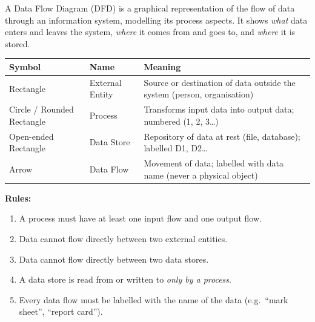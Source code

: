 \documentclass[11pt]{article}
\newcommand{\cle}[1]{{\popxbold\color{popdark}#1}}
\begin{document}
\begin{definition}
A \cle{Data Flow Diagram (DFD)} is a graphical representation of the flow of data through an information system, modelling its process aspects. It shows \emph{what} data enters and leaves the system, \emph{where} it comes from and goes to, and \emph{where} it is stored.
\end{definition}

\begin{propriete}
\begin{center}
\begin{tabularx}{\linewidth}{|l|X|X|}
\hline
\rowcolor{popblueL} \textbf{Symbol} & \textbf{Name} & \textbf{Meaning} \\
\hline
Rectangle & External Entity & Source or destination of data outside the system (person, organisation) \\
\hline
Circle / Rounded Rectangle & Process & Transforms input data into output data; numbered (1, 2, 3\dots) \\
\hline
Open-ended Rectangle & Data Store & Repository of data at rest (file, database); labelled D1, D2\dots \\
\hline
Arrow & Data Flow & Movement of data; labelled with data name (never a physical object) \\
\hline
\end{tabularx}
\end{center}

\textbf{Rules:}
\begin{enumerate}
\item A process must have at least one input flow and one output flow.
\item Data cannot flow directly between two external entities.
\item Data cannot flow directly between two data stores.
\item A data store is read from or written to \emph{only by a process}.
\item Every data flow must be labelled with the name of the data (e.g.\ ``mark sheet'', ``report card'').
\end{enumerate}
\end{propriete}
\end{document}
